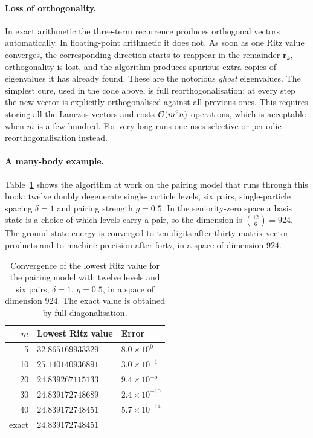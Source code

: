 \paragraph{Loss of orthogonality.}
In exact arithmetic the three-term recurrence produces orthogonal vectors
automatically.  In floating-point arithmetic it does not.  As soon as one Ritz
value converges, the corresponding direction starts to reappear in the
remainder $\bm{r}_k$, orthogonality is lost, and the algorithm produces
spurious extra copies of eigenvalues it has already found.  These are the
notorious \emph{ghost} eigenvalues.  The simplest cure, used in the code
above, is full reorthogonalisation: at every step the new vector is
explicitly orthogonalised against all previous ones.  This requires storing
all the Lanczos vectors and costs $\mathcal{O}(m^2n)$ operations, which is
acceptable when $m$ is a few hundred.  For very long runs one uses selective
or periodic reorthogonalisation instead.

\paragraph{A many-body example.}
Table~\ref{tab:lanczos} shows the algorithm at work on the pairing model that
runs through this book: twelve doubly degenerate single-particle levels,
six pairs, single-particle spacing $\delta=1$ and pairing strength $g=0.5$.
In the seniority-zero space a basis state is a choice of which levels carry a
pair, so the dimension is $\binom{12}{6}=924$.  The ground-state energy is
converged to ten digits after thirty matrix-vector products and to machine
precision after forty, in a space of dimension $924$.

\begin{table}[h]
\centering
\renewcommand{\arraystretch}{1.25}
\setlength{\tabcolsep}{10pt}
\begin{tabular}{rll}
\toprule
$m$ & \textbf{Lowest Ritz value} & \textbf{Error} \\
\midrule
 5 & $32.865169933329$ & $8.0\times10^{0}$  \\
10 & $25.140140936891$ & $3.0\times10^{-1}$ \\
20 & $24.839267115133$ & $9.4\times10^{-5}$ \\
30 & $24.839172748689$ & $2.4\times10^{-10}$\\
40 & $24.839172748451$ & $5.7\times10^{-14}$\\
\midrule
exact & $24.839172748451$ & \\
\bottomrule
\end{tabular}
\caption{Convergence of the lowest Ritz value for the pairing model with
twelve levels and six pairs, $\delta=1$, $g=0.5$, in a space of dimension
$924$.  The exact value is obtained by full diagonalisation.}
\label{tab:lanczos}
\end{table}

